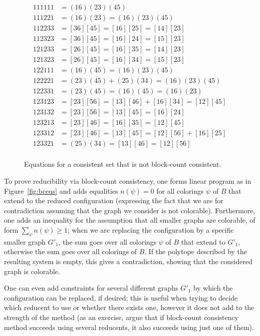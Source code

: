 \documentclass[12pt,twoside,openright,a4paper]{book}
\begin{document}
\begin{figure}
\begin{align*}
111111 &= (16)(23)(45)\\
111221 &= (16)(23) = (16)(23)(45)\\
112233 &= [36][45] = [16][25] = [14][23]\\
112323 &= [36][45] = [16][24] = [15][23]\\
121233 &= [26][45] = [16][35] = [14][23]\\
121323 &= [26][45] = [16][34] = [15][23]\\
122111 &= (16)(45) = (16)(23)(45) \\
122221 &= (23)(45) + (25)(34) = (16)(23)(45)\\
122331 &= (23)(45) = (16)(45) = (16)(23)\\
123123 &= [23][56] = [13][46] + [16][34] = [12][45]\\
123132 &= [23][56] = [13][45] = [16][24]\\
123213 &= [23][46] = [16][35] = [12][45]\\
123312 &= [23][46] = [13][45] = [12][56] + [16][25]\\
123321 &= (25)(34) = [13][46] = [12][56]\\
\end{align*}
\caption{Equations for a consistent set that is not block-count consistent.}\label{fig:consnobc}
\end{figure}

To prove reducibility via block-count consistency, one forms linear program as in Figure~\ref{fig:bceqs} and
adds equalities $n(\psi)=0$ for all colorings $\psi$ of $B$ that extend to the reduced configuration (expressing
the fact that we are for contradiction assuming that the graph we consider is not colorable).
Furthermore, one adds an inequality for the assumption that all smaller graphs are colorable, of form $\sum_{\psi} n(\psi)\ge 1$;
when we are replacing the configuration by a specific smaller graph $G'_1$, the sum goes over all colorings $\psi$ of $B$ that extend to $G'_1$,
otherwise the sum goes over all colorings of $B$.  If the polytope described by the resulting system is empty, this gives a contradiction,
showing that the considered graph is colorable.

One can even add constraints for several different graphs $G'_1$ by which the configuration can be replaced, if desired; this is useful
when trying to decide which reducent to use or whether there exists one, however it does not add to the strength of the method
(as an exercise, argue that if block-count consistency method succeeds using several reducents, it also succeeds using just one of them).
\end{document}
